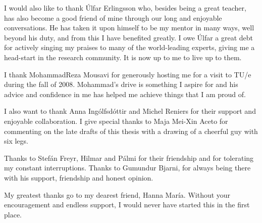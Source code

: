 I would also like to thank {\'U}lfar Erlingsson who, besides being a great teacher,
has also become a good friend of mine through our long and enjoyable conversations.
He has taken it upon himself to be my mentor in many ways, well beyond his duty, 
and from this I have benefited greatly.
I owe {\'U}lfar a great debt for actively singing my praises to many of the world-leading
experts, giving me a head-start in the research community.
It is now up to me to live up to them.

I thank MohammadReza Mousavi for generously hosting me for a visit
to TU/e during the fall of 2008. Mohammad's drive is something I aspire for
and his advice and confidence in me has helped me achieve things that I am
proud of.

I also want to thank Anna Ing{\'o}lfsd{\'o}ttir and Michel Reniers for their
support and enjoyable collaboration. I give special thanks to Maja Mei-Xin Aceto
for commenting on the late drafts of this thesis with a drawing of a cheerful 
guy with six legs.

Thanks to Stef{\'a}n Freyr, Hilmar and P{\'a}lmi for their friendship and for
tolerating my constant interruptions. Thanks to Gu\dh{}mundur Bjarni, for always
being there with his support, friendship and honest opinion.

My greatest thanks go to my dearest friend, Hanna Mar{\'i}a. Without your encouragement
and endless support, I would never have started this in the first place.

